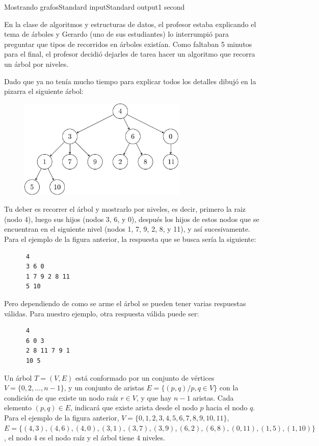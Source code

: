 \begin{problem}{Mostrando grafos}{Standard input}{Standard output}{1 second}{}


En la clase de algoritmos y estructuras de datos, el profesor estaba explicando el tema de árboles y Gerardo (uno de sus estudiantes) lo interrumpió para preguntar que tipos de recorridos en árboles existían. Como faltaban 5 minutos para el final, el profesor decidió dejarles de tarea hacer un algoritmo que recorra un árbol por niveles.

Dado que ya no tenía mucho tiempo para explicar todos los detalles dibujó en la pizarra el siguiente árbol:

\begin{figure}[h]
\centering
\includegraphics[width=8cm]{images/tree.pdf}
\end{figure}

Tu deber es recorrer el árbol y mostrarlo por niveles, es decir, primero la raiz (nodo 4), luego sus hijos (nodos 3, 6, y 0), después los hijos de estos nodos que se encuentran en el siguiente nivel (nodos 1, 7, 9, 2, 8, y 11), y as\'i sucesivamente. Para el ejemplo de la figura anterior, la respuesta que se busca ser\'ia la siguiente:

\begin{verbatim}
      4
      3 6 0
      1 7 9 2 8 11
      5 10
\end{verbatim}

Pero dependiendo de como se arme el árbol se pueden tener varias respuestas válidas. Para nuestro ejemplo, otra respuesta válida puede ser:

\begin{verbatim}
      4
      6 0 3
      2 8 11 7 9 1 
      10 5
\end{verbatim}

Un \'arbol $ T = (V, E)$ está conformado por un conjunto de v\'ertices $V = \lbrace 0, 2, \dots, n-1\rbrace$, y un conjunto de aristas $E = \lbrace (p, q) / p, q \in V \rbrace$ con la condici\'on de que existe un nodo ra\'iz $r \in V$, y que hay $n-1$ aristas. Cada elemento $(p, q) \in E$, indicar\'a que existe arista desde el nodo $p$ hacia el nodo $q$. Para el ejemplo de la figura anterior, $V = \lbrace 0, 1, 2, 3, 4, 5, 6, 7, 8, 9, 10, 11 \rbrace$, $E=\lbrace(4,3), (4, 6), (4, 0), (3, 1), (3, 7), (3, 9), (6, 2), (6, 8), (0, 11), (1, 5), (1, 10)\rbrace$, el nodo $4$ es el nodo raíz y el árbol tiene $4$ niveles.



\end{problem}
